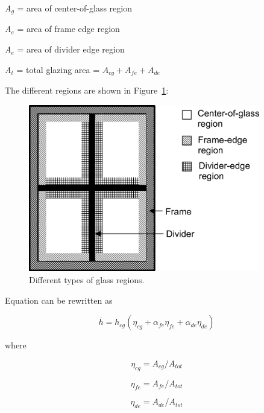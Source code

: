 \emph{A\(_{g}\)} = area of center-of-glass region

\emph{A\(_{e}\)} = area of frame edge region

\emph{A\(_{e}\)} = area of divider edge region

\emph{A\(_{t}\)} = total glazing area = \({A_{cg}} + {A_{fe}} + {A_{de}}\)

The different regions are shown in Figure~\ref{fig:different-types-of-glass-regions.}:

\begin{figure}[hbtp] %
\centering
\includegraphics[width=0.9\textwidth, height=0.9\textheight, keepaspectratio=true]{media/image1534.png}
\caption{  Different types of glass regions. \protect \label{fig:different-types-of-glass-regions.}}
\end{figure}

Equation can be rewritten as

\begin{equation}
\overline h  = {h_{cg}}\left( {{\eta_{cg}} + {\alpha_{fe}}{\eta_{fe}} + {\alpha_{de}}{\eta_{de}}} \right)
\end{equation}

where

\begin{equation}
{\eta_{cg}} = {A_{cg}}/{A_{tot}}
\end{equation}

\begin{equation}
{\eta_{fe}} = {A_{fe}}/{A_{tot}}
\end{equation}

\begin{equation}
{\eta_{de}} = {A_{de}}/{A_{tot}}
\end{equation}

